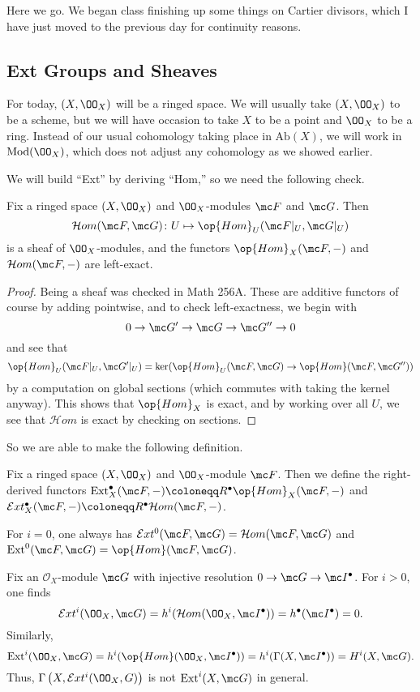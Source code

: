 \documentclass[../notes.tex]{subfiles}
\begin{document}
Here we go. We began class finishing up some things on Cartier divisors, which I have just moved to the previous day for continuity reasons.

\subsection{Ext Groups and Sheaves}
For today, $(X,\OO_X)$ will be a ringed space. We will usually take $(X,\OO_X)$ to be a scheme, but we will have occasion to take $X$ to be a point and $\OO_X$ to be a ring. Instead of our usual cohomology taking place in $\mathrm{Ab}(X)$, we will work in $\mathrm{Mod}(\OO_X)$, which does not adjust any cohomology as we showed earlier.

We will build ``Ext'' by deriving ``Hom,'' so we need the following check.
\begin{proposition}
	Fix a ringed space $(X,\OO_X)$ and $\OO_X$-modules $\mc F$ and $\mc G$. Then
	\[\mathcal Hom(\mc F,\mc G)\colon U\mapsto\op{Hom}_U(\mc F|_U,\mc G|_U)\]
	is a sheaf of $\OO_X$-modules, and the functors $\op{Hom}_X(\mc F,-)$ and $\mathcal Hom(\mc F,-)$ are left-exact.
\end{proposition}
\begin{proof}
	Being a sheaf was checked in Math 256A. These are additive functors of course by adding pointwise, and to check left-exactness, we begin with
	\[0\to\mc G'\to\mc G\to\mc G''\to0\]
	and see that
	\[\op{Hom}_U(\mc F|_U,\mc G'|_U)=\ker(\op{Hom}_U(\mc F,\mc G)\to\op{Hom}(\mc F,\mc G''))\]
	by a computation on global sections (which commutes with taking the kernel anyway). This shows that $\op{Hom}_X$ is exact, and by working over all $U$, we see that $\mathcal Hom$ is exact by checking on sections.
\end{proof}
So we are able to make the following definition.
\begin{definition}[Ext]
	Fix a ringed space $(X,\OO_X)$ and $\OO_X$-module $\mc F$. Then we define the right-derived functors $\mathrm{Ext}^\bullet_X(\mc F,-)\coloneqq R^\bullet\op{Hom}_X(\mc F,-)$ and $\mathcal Ext^\bullet_X(\mc F,-)\coloneqq R^\bullet\mathcal Hom(\mc F,-)$.
\end{definition}
\begin{example}
	For $i=0$, one always has $\mathcal Ext^0(\mc F,\mc G)=\mathcal Hom(\mc F,\mc G)$ and $\mathrm{Ext}^0(\mc F,\mc G)=\op{Hom}(\mc F,\mc G)$.
\end{example}
\begin{example} \label{ex:ext-and-h}
	Fix an $\mathcal O_X$-module $\mc G$ with injective resolution $0\to\mc G\to\mc I^\bullet$. For $i>0$, one finds
	\[\mathcal Ext^i(\OO_X,\mc G)=h^i(\mathcal Hom(\OO_X,\mc I^\bullet))=h^\bullet(\mc I^\bullet)=0.\]
	Similarly,
	\[\mathrm{Ext}^i(\OO_X,\mc G)=h^i(\op{Hom}(\OO_X,\mc I^\bullet))=h^i(\Gamma(X,\mc I^\bullet))=H^i(X,\mc G).\]
	Thus, $\Gamma\left(X,\mathcal Ext^i(\OO_X,G)\right)$ is not $\mathrm{Ext}^i(X,\mc G)$ in general.
\end{example}
\end{document}
